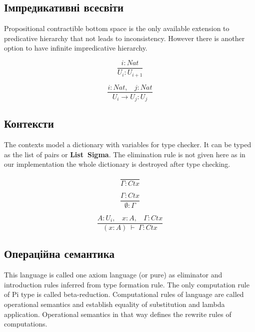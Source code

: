 \subsection*{Імпредикативні всесвіти}
Propositional contractible bottom space is the only
available extension to predicative hierarchy that not leads to inconsistency.
However there is another option to have infinite
impredicative hierarchy.

\begin{equation}
\tag{$A_2$}
\dfrac
{i: Nat}
{U_i : U_{i+1}}
\end{equation}

\begin{equation}
\tag{$R_2$}
\dfrac
{i : Nat,\ \ \ \ j : Nat}
{U_i \rightarrow U_{j} : U_{j}}
\end{equation}

\subsection{Контексти}

The contexts model a dictionary with variables for type checker.
It can be typed as the list of pairs or {\bf List\ Sigma}.
The elimination rule is not given here as in our implementation the whole dictionary is destroyed after type checking.

\begin{equation}
\tag{Ctx-formation}
\dfrac
{}
{\Gamma : Ctx}
\end{equation}

\begin{equation}
\tag{Ctx-intro$_1$}
\dfrac
{\Gamma : Ctx}
{\emptyset : \Gamma}
\end{equation}

\begin{equation}
\tag{Ctx-intro$_2$}
\dfrac
{A : U_i,\ \ \ \ x : A,\ \ \ \ \Gamma : Ctx}
{(x : A)\ \vdash\ \Gamma : Ctx}
\end{equation}

\newpage
\subsection{Операційна семантика}

This language is called one axiom language (or pure) as eliminator
and introduction rules inferred from type formation rule.
The only computation rule of Pi type is called beta-reduction.
Computational rules of language are called operational semantics
and establish equality of substitution and lambda application.
Operational semantics in that way defines the rewrite rules of computations.

